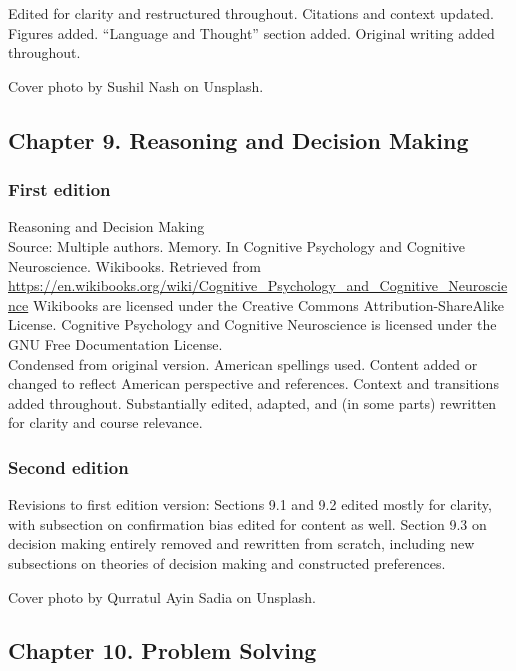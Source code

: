 \documentclass[
]{krantz}
\begin{document}
Edited for clarity and restructured throughout. Citations and context updated. Figures added. ``Language and Thought'' section added. Original writing added throughout.

Cover photo by Sushil Nash on Unsplash.

\subsection*{Chapter 9. Reasoning and Decision Making}\label{chapter-9.-reasoning-and-decision-making}


\subsubsection*{First edition}\label{first-edition-9}


Reasoning and Decision Making\\
Source: Multiple authors. Memory. In Cognitive Psychology and Cognitive Neuroscience. Wikibooks. Retrieved from \url{https://en.wikibooks.org/wiki/Cognitive_Psychology_and_Cognitive_Neuroscience}
Wikibooks are licensed under the Creative Commons Attribution-ShareAlike License.
Cognitive Psychology and Cognitive Neuroscience is licensed under the GNU Free Documentation License.\\
Condensed from original version. American spellings used. Content added or changed to reflect American perspective and references. Context and transitions added throughout. Substantially edited, adapted, and (in some parts) rewritten for clarity and course relevance.

\subsubsection*{Second edition}\label{second-edition-8}


Revisions to first edition version: Sections 9.1 and 9.2 edited mostly for clarity, with subsection on confirmation bias edited for content as well. Section 9.3 on decision making entirely removed and rewritten from scratch, including new subsections on theories of decision making and constructed preferences.

Cover photo by Qurratul Ayin Sadia on Unsplash.

\subsection*{Chapter 10. Problem Solving}\label{chapter-10.-problem-solving}
\end{document}
